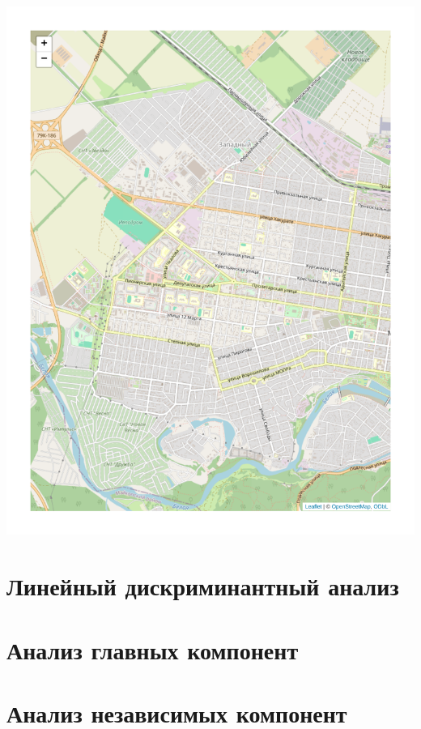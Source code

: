 \documentclass[
  letterpaper,
]{scrbook}
\theoremstyle{definition}
\theoremstyle{remark}
\begin{document}
\includegraphics{andan-cluster_files/figure-pdf/maikop-1.pdf}


\chapter{Линейный дискриминантный анализ}\label{andan-lda}


\chapter{Анализ главных компонент}\label{andan-pca}


\chapter{Анализ независимых компонент}\label{andan-ica}
\end{document}
